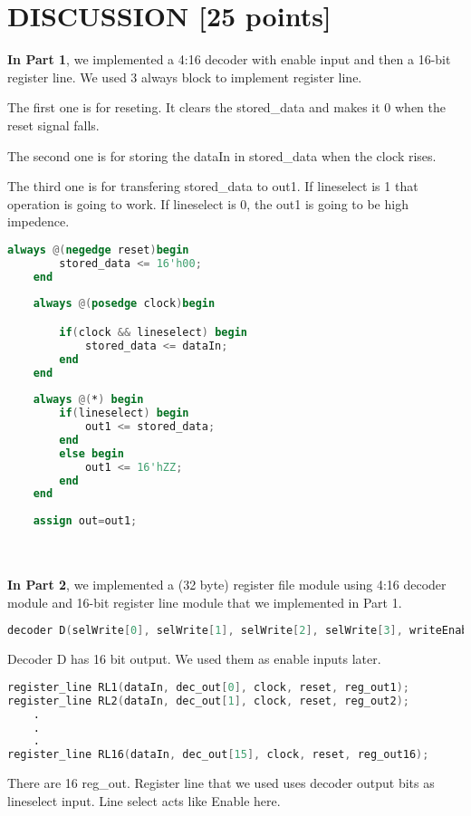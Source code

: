 \documentclass[pdftex,12pt,a4paper]{article}
\begin{document}
\section{DISCUSSION [25 points]}
\textbf{In Part 1}, we implemented a 4:16 decoder with enable input and then a 16-bit register line.  We used 3 always block to implement register line. 

The first one is for reseting. It clears the stored\_data and makes it 0 when the reset signal falls.

The second one is for storing the dataIn in stored\_data when the clock rises.

The third one is for transfering stored\_data to out1. If lineselect is 1 that operation is going to work. If lineselect is 0, the out1 is going to be high impedence.\\

\begin{lstlisting}[language=Verilog, caption=Register line code]
always @(negedge reset)begin
        stored_data <= 16'h00;
    end
    
    always @(posedge clock)begin

        if(clock && lineselect) begin
            stored_data <= dataIn;
        end
    end
    
    always @(*) begin
        if(lineselect) begin
            out1 <= stored_data;
        end
        else begin
            out1 <= 16'hZZ;
        end
    end
    
    assign out=out1;
\end{lstlisting}
\\
\\
\textbf{In Part 2}, we implemented a (32 byte) register file module using 4:16 decoder module and 16-bit register line module that we implemented in Part 1.

\begin{lstlisting}[language=Verilog, caption=Decoder]
 decoder D(selWrite[0], selWrite[1], selWrite[2], selWrite[3], writeEnable, dec_out);
\end{lstlisting}
Decoder D has 16 bit output. We used them as enable inputs later.
\clearpage

\begin{lstlisting}[language=Verilog, caption=Register Line]
register_line RL1(dataIn, dec_out[0], clock, reset, reg_out1);
register_line RL2(dataIn, dec_out[1], clock, reset, reg_out2);
    .
    .
    .
register_line RL16(dataIn, dec_out[15], clock, reset, reg_out16);
\end{lstlisting}
There are 16 reg\_out. Register line that we used uses decoder output bits as lineselect input. Line select acts like Enable here.\\
\\
\end{document}
